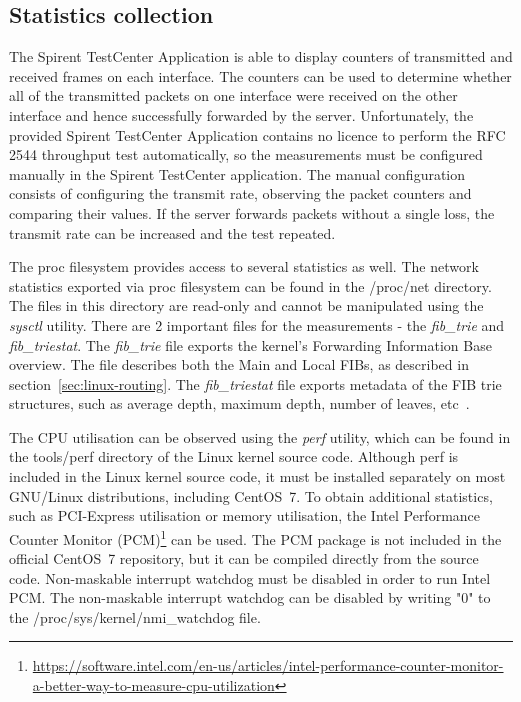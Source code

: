 
\subsection{Statistics collection}\label{sub:analysis-metodology-collection}
The Spirent TestCenter Application is able to display counters of transmitted and received frames on each interface.
The counters can be used to determine whether all of the transmitted packets on one interface were received
on the other interface and hence successfully forwarded by the server.
Unfortunately, the provided Spirent TestCenter Application contains no licence to perform the RFC 2544 throughput test
automatically, so the measurements must be configured manually in the Spirent TestCenter application.
The manual configuration consists of configuring the transmit rate, observing the packet counters and comparing their values.
If the server forwards packets without a single loss, the transmit rate can be increased and the test repeated.

The proc filesystem provides access to several statistics as well.
The network statistics exported via proc filesystem can be found in the /proc/net directory.
The files in this directory are read-only and cannot be manipulated using the {\it{sysctl}} utility.
There are 2 important files for the measurements - the {\it{fib\_trie}} and {\it{fib\_triestat}}.
The {\it{fib\_trie}} file exports the kernel's Forwarding Information Base overview.
The file describes both the Main and Local FIBs, as described in section~\ref{sec:linux-routing}.
The {\it{fib\_triestat}} file exports metadata of the FIB trie structures,
such as average depth, maximum depth, number of leaves, etc~\cite{kernel-source}.

The CPU utilisation can be observed using the {\it{perf}} utility,
which can be found in the tools/perf directory of the Linux kernel source code.
Although perf is included in the Linux kernel source code,
it must be installed separately on most GNU/Linux distributions, including CentOS~7.
To obtain additional statistics, such as PCI-Express utilisation or memory utilisation,
the Intel Performance Counter Monitor (PCM)\footnote{\url{https://software.intel.com/en-us/articles/intel-performance-counter-monitor-a-better-way-to-measure-cpu-utilization}}
can be used.
The PCM package is not included in the official CentOS~7 repository,
but it can be compiled directly from the source code.
Non-maskable interrupt watchdog must be disabled
in order to run Intel PCM.
The non-maskable interrupt watchdog can be disabled by writing "0" to the /proc/sys/kernel/nmi\_watchdog file.
